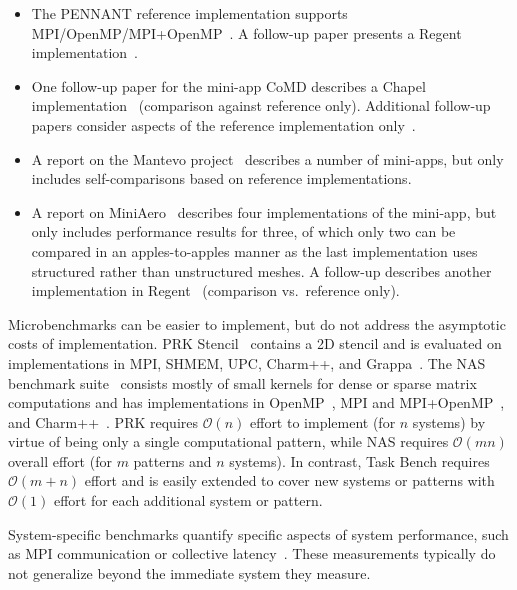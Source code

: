 \begin{itemize}
\item The PENNANT reference implementation supports
MPI/OpenMP/MPI+OpenMP~\cite{PENNANT}. A follow-up paper presents a
Regent implementation~\cite{Regent15}.

\item One follow-up paper for the mini-app CoMD describes a Chapel
implementation~\cite{CoMDChapel16} (comparison against reference
only). Additional follow-up papers consider aspects of the reference
implementation only~\cite{CoMDLoadImbalance17,
  CoMDThreadedModels14}.

\item A report on the Mantevo project~\cite{Mantevo09} describes a number of
mini-apps, but only includes self-comparisons based on reference
implementations.

\item A report on MiniAero~\cite{SandiaReportManyTaskRuntimes15} describes
four implementations of the mini-app, but only includes performance
results for three, of which only two can be compared in an
apples-to-apples manner as the last implementation uses structured
rather than unstructured meshes. A follow-up describes another
implementation in Regent~\cite{Regent15} (comparison vs.~reference
only).
\end{itemize}

Microbenchmarks can be easier to implement, but do not address the
asymptotic costs of implementation. PRK Stencil~\cite{PRK14} contains a
2D stencil and is evaluated on implementations in MPI, SHMEM, UPC,
Charm++, and Grappa~\cite{PRKRuntimes16}. The NAS benchmark
suite~\cite{NAS91, NAS95} consists mostly of small kernels for dense
or sparse matrix computations and has implementations in
OpenMP~\cite{NASOpenMP99}, MPI and MPI+OpenMP~\cite{NASMPIOpenMP00},
and Charm++~\cite{NASCharm96}. PRK requires $\mathcal{O}(n)$ effort to
implement (for $n$ systems) by virtue of being only a single
computational pattern, while NAS requires $\mathcal{O}(mn)$ overall
effort (for $m$ patterns and $n$ systems). In contrast, Task Bench
requires $\mathcal{O}(m+n)$ effort and is easily extended to cover new
systems or patterns with $\mathcal{O}(1)$ effort for each additional
system or pattern.

System-specific benchmarks quantify specific aspects
of system performance, such as MPI communication or collective
latency~\cite{MPPTest99, MPIBench01}. These measurements typically do
not generalize beyond the immediate system they measure.

